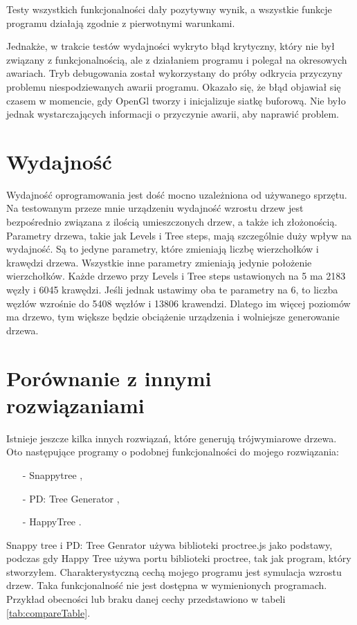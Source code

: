 \documentclass[a4paper,twoside,12pt]{report}
\begin{document}
Testy wszystkich funkcjonalności dały pozytywny wynik, 
a wszystkie funkcje programu działają zgodnie z pierwotnymi 
warunkami. 

Jednakże, w trakcie testów wydajności wykryto błąd krytyczny, 
który nie był związany z funkcjonalnością, ale z 
działaniem programu i polegał na okresowych awariach.  
Tryb debugowania został wykorzystany do próby odkrycia 
przyczyny problemu niespodziewanych awarii programu. 
Okazało się, że błąd objawiał się czasem w momencie, 
gdy OpenGl tworzy i inicjalizuje siatkę buforową. 
Nie było jednak wystarczających informacji o przyczynie awarii, 
aby naprawić problem. 

\section{Wydajność}

Wydajność oprogramowania jest dość mocno uzależniona 
od używanego sprzętu. Na testowanym przeze mnie 
urządzeniu wydajność wzrostu drzew jest bezpośrednio 
związana z ilością umieszczonych drzew, a także ich 
złożonością. Parametry drzewa, takie jak Levels i Tree steps, 
mają szczególnie duży wpływ na wydajność.
Są to jedyne parametry, które zmieniają liczbę wierzchołków i 
krawędzi drzewa. Wszystkie inne parametry zmieniają jedynie 
położenie wierzchołków. Każde drzewo przy Levels i Tree steps 
ustawionych na 5 ma 2183 węzły i 6045 krawędzi. 
Jeśli jednak ustawimy oba te parametry na 6, 
to liczba węzłów wzrośnie do 5408 węzłów i 13806 krawendzi. 
Dlatego im więcej poziomów ma drzewo, tym większe będzie obciążenie urządzenia 
i wolniejsze generowanie drzewa.

\section{Porównanie z innymi rozwiązaniami}

Istnieje jeszcze kilka innych rozwiązań, które generują 
trójwymiarowe drzewa. Oto następujące programy o podobnej 
funkcjonalności do mojego rozwiązania:
\begin{itemize}
	\item[-] Snappytree \cite{snappyTree},
	\item[-] PD: Tree Generator \cite{PDTree},
	\item[-] HappyTree \cite{proctree}. 
\end{itemize}
Snappy tree i PD: Tree Genrator używa biblioteki proctree.js 
jako podstawy, podczas gdy Happy Tree używa portu biblioteki proctree, 
tak jak program, który stworzyłem.
Charakterystyczną cechą mojego programu jest symulacja wzrostu drzew. 
Taka funkcjonalność nie jest dostępna w wymienionych programach.
Przykład obecności lub braku danej cechy przedstawiono w tabeli \ref{tab:compareTable}.
\end{document}
